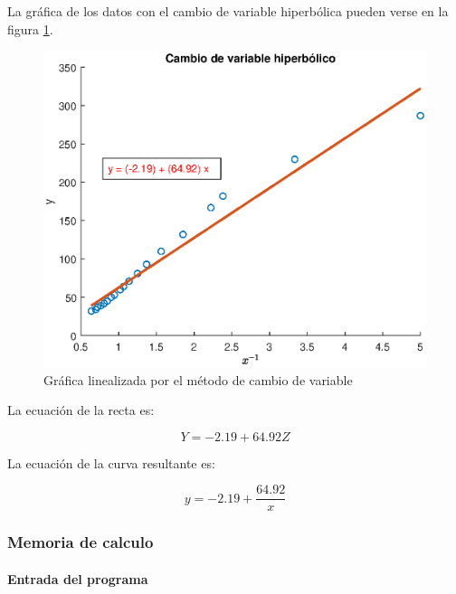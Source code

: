 \documentclass[letter,11pt]{article}
\begin{document}
La gráfica de los datos con el cambio de variable hiperbólica pueden verse en la
figura \ref{practica31_3}.

\begin{figure}[!h]
\centering
\includegraphics[scale=1.00]{resources/3.1.3.eps}
\caption{Gráfica linealizada por el método de cambio de variable}
\label{practica31_3}
\end{figure}

La ecuación de la recta es:

\begin{equation}
    Y = -2.19 + 64.92 Z
\end{equation}

La ecuación de la curva resultante es:

\begin{equation}
    y = -2.19 + \frac{64.92}{x}
\end{equation}

\subsubsection{Memoria de calculo}

\paragraph{Entrada del programa}
\begin{alltt}
\footnotesize

\normalsize
\end{alltt}
\end{document}
